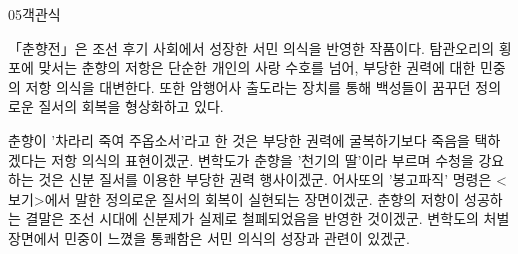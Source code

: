 \documentclass[fs85,seriesWit]{korfarm-base}
\begin{document}
\begin{kfQBlock}{05}{객관식}
\begin{kfEvidence}「춘향전」은 조선 후기 사회에서 성장한 서민 의식을 반영한 작품이다. 탐관오리의 횡포에 맞서는 춘향의 저항은 단순한 개인의 사랑 수호를 넘어, 부당한 권력에 대한 민중의 저항 의식을 대변한다. 또한 암행어사 출도라는 장치를 통해 백성들이 꿈꾸던 정의로운 질서의 회복을 형상화하고 있다.\end{kfEvidence}
\begin{kfChoices}
\kfChoice 춘향이 '차라리 죽여 주옵소서'라고 한 것은 부당한 권력에 굴복하기보다 죽음을 택하겠다는 저항 의식의 표현이겠군.
\kfChoice 변학도가 춘향을 '천기의 딸'이라 부르며 수청을 강요하는 것은 신분 질서를 이용한 부당한 권력 행사이겠군.
\kfChoice 어사또의 '봉고파직' 명령은 <보기>에서 말한 정의로운 질서의 회복이 실현되는 장면이겠군.
\kfChoice 춘향의 저항이 성공하는 결말은 조선 시대에 신분제가 실제로 철폐되었음을 반영한 것이겠군.
\kfChoice 변학도의 처벌 장면에서 민중이 느꼈을 통쾌함은 서민 의식의 성장과 관련이 있겠군.
\end{kfChoices}
\end{kfQBlock}

\kfEndMC
\end{document}
